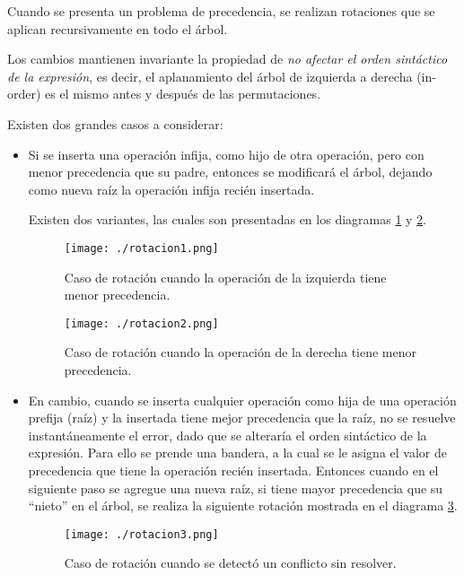Cuando se presenta un problema de precedencia, se realizan rotaciones que se aplican recursivamente en todo el árbol. 

Los cambios mantienen invariante la propiedad de \textit{no afectar el orden sintáctico de la expresión}, es decir, el aplanamiento del árbol de izquierda a derecha (in-order) es el mismo antes y después de las permutaciones.

Existen dos grandes casos a considerar:

\begin{itemize}
\item Si se inserta una operación infija, como hijo de otra operación, pero con menor precedencia que su padre, entonces se modificará el árbol, dejando como nueva raíz la operación infija recién insertada. 

Existen dos variantes, las cuales son presentadas en los diagramas \ref{rotacion1} y \ref{rotacion2}.

\begin{figure}[!ht]\centering
\texttt{[image: ./rotacion1.png]}
\caption{\label{rotacion1} Caso de rotación cuando la operación de la izquierda tiene menor precedencia.}
\end{figure}

\begin{figure}[!ht]\centering
\texttt{[image: ./rotacion2.png]}
\caption{\label{rotacion2} Caso de rotación cuando la operación de la derecha tiene menor precedencia.}
\end{figure}

\item En cambio, cuando se inserta cualquier operación como hija de una operación prefija (raíz) y la insertada tiene mejor precedencia que la raíz, no se resuelve instantáneamente el error, dado que se alteraría el orden sintáctico de la expresión. Para ello se prende una bandera, a la cual se le asigna el valor de precedencia que tiene la operación recién insertada. Entonces cuando en el siguiente paso se agregue una nueva raíz, si tiene mayor precedencia que su ``nieto'' en el árbol, se realiza la siguiente rotación mostrada en el diagrama \ref{rotacion3}.

\begin{figure}[!ht]\centering
\texttt{[image: ./rotacion3.png]}
\caption{\label{rotacion3} Caso de rotación cuando se detectó un conflicto sin resolver.}
\end{figure}
\end{itemize}

